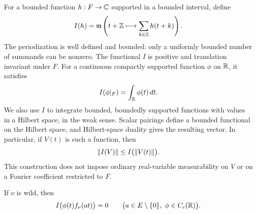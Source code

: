 For a bounded function $h:F\to\mathbb C$ supported in a bounded interval, define
\begin{equation}\label{eq:spectral-invariant-integral}
 I(h)=\mathfrak m\left(t+\mathbb Z\longmapsto
                         \sum_{k\in\mathbb Z}h(t+k)\right).
\end{equation}
The periodization is well defined and bounded: only a uniformly bounded
number of summands can be nonzero. The functional $I$ is positive and
translation invariant under $F$. For a continuous compactly supported
function $\phi$ on $\mathbb R$, it satisfies
\[
 I(\phi|_F)=\int_\mathbb R\phi(t)\,dt.
\]
We also use $I$ to integrate bounded, boundedly supported functions with
values in a Hilbert space, in the weak sense. Scalar pairings define a
bounded functional on the Hilbert space, and Hilbert-space duality gives
the resulting vector. In particular, if $V(t)$ is such a function, then
\[
 \lVert I(V)\rVert\le I\bigl(\lVert V(t)\rVert\bigr).
\]
This construction does not impose ordinary real-variable measurability
on $V$ or on a Fourier coefficient restricted to $F$.

\begin{lemma}\label{lem:line-average}
If $\nu$ is wild, then
\begin{equation}\label{eq:source-2}
 I\bigl(\phi(t)f_\nu(at)\bigr)=0
 \qquad\bigl(a\in E\setminus\{0\},\ \phi\in C_c(\mathbb R)\bigr).
\end{equation}
\end{lemma}

